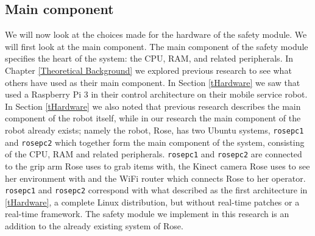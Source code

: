 \documentclass[12pt]{scrreprt}
\begin{document}
\subsection{Main component}
\label{Main component}
We will now look at the choices made for the hardware of the safety module. We will first look at the main component. The main component of the safety module specifies the heart of the system: the CPU, RAM, and related peripherals. In Chapter \ref{Theoretical Background} we explored previous research to see what others have used as their main component. In Section \ref{tHardware} we saw that \citeauthor{delgado} used a Raspberry Pi 3 in their control architecture on their mobile service robot. In Section  \ref{tHardware} we also noted that previous research describes the main component of the robot itself, while in our research the main component of the robot already exists; namely the robot, Rose, has two Ubuntu systems, \texttt{rosepc1} and \texttt{rosepc2} which together form the main component of the system, consisting of the CPU, RAM and related peripherals. \texttt{rosepc1} and \texttt{rosepc2} are connected to the grip arm Rose uses to grab items with, the Kinect camera Rose uses to see her environment with and the WiFi router which connects Rose to her operator. \texttt{rosepc1} and \texttt{rosepc2} correspond with what \citeauthor{bouchier} described as the first architecture in \ref{tHardware}, a complete Linux distribution, but without real-time patches or a real-time framework. The safety module we implement in this research is an addition to the already existing system of Rose.\\
\end{document}
